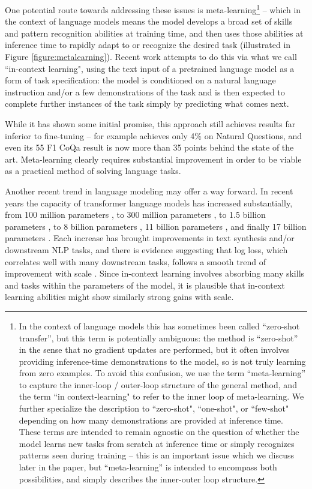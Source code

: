 One potential route towards addressing these issues is meta-learning\footnote{In the context of language models this has sometimes been called ``zero-shot transfer'', but this term is potentially ambiguous: the method is ``zero-shot'' in the sense that no gradient updates are performed, but it often involves providing inference-time demonstrations to the model, so is not truly learning from zero examples.  To avoid this confusion, we use the term ``meta-learning'' to capture the inner-loop / outer-loop structure of the general method, and the term ``in context-learning" to refer to the inner loop of meta-learning. We further specialize the description to ``zero-shot", ``one-shot", or ``few-shot" depending on how many demonstrations are provided at inference time.  These terms are intended to remain agnostic on the question of whether the model learns new tasks from scratch at inference time or simply recognizes patterns seen during training -- this is an important issue which we discuss later in the paper, but ``meta-learning'' is intended to encompass both possibilities, and simply describes the inner-outer loop structure.} -- which in the context of language models means the model develops a broad set of skills and pattern recognition abilities at training time, and then uses those abilities at inference time to rapidly adapt to or recognize the desired task (illustrated in Figure \ref{figure:metalearning}). Recent work \cite{radford2019language} attempts to do this via what we call ``in-context learning", using the text input of a pretrained language model as a form of task specification: the model is conditioned on a natural language instruction and/or a few demonstrations of the task and is then expected to complete further instances of the task simply by predicting what comes next.

While it has shown some initial promise, this approach still achieves results far inferior to fine-tuning -- for example \cite{radford2019language} achieves only 4\% on Natural Questions, and even its 55 F1 CoQa result is now more than 35 points behind the state of the art.  Meta-learning clearly requires substantial improvement in order to be viable as a practical method of solving language tasks.

Another recent trend in language modeling may offer a way forward.  In recent years the capacity of transformer language models has increased substantially, from 100 million parameters \cite{radford2018gpt1}, to 300 million parameters \cite{devlin2018bert}, to 1.5 billion parameters \cite{radford2019language}, to 8 billion parameters \cite{shoeybi2019megatronlm}, 11 billion parameters \cite{raffel2019t5}, and finally 17 billion parameters \cite{turing_17m}.  Each increase has brought improvements in text synthesis and/or downstream NLP tasks, and there is evidence suggesting that log loss, which correlates well with many downstream tasks, follows a smooth trend of improvement with scale \cite{kaplan2020scaling}.  Since in-context learning involves absorbing many skills and tasks within the parameters of the model, it is plausible that in-context learning abilities might show similarly strong gains with scale.

